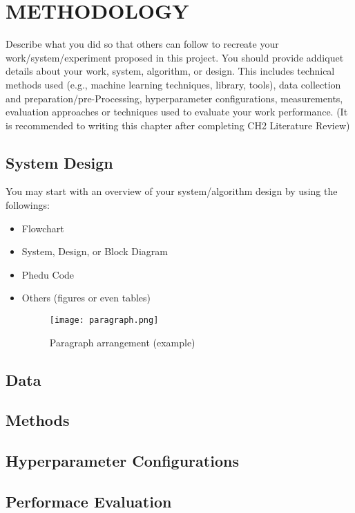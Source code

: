 \chapter{METHODOLOGY}

Describe what you did so that others can follow to recreate your work/system/experiment proposed in this project.
You should provide addiquet details about your work, system, algorithm, or design. This includes technical methods used (e.g., machine learning techniques, library, tools), data collection and preparation/pre-Processing, hyperparameter configurations, measurements, evaluation approaches or techniques used to evaluate your work performance. (It is recommended to writing this chapter after completing CH2 Literature Review)

\section{System Design}
\noindent\hspace{2.2em}You may start with an overview of your system/algorithm design by using the followings:
\begin{itemize}
    \item Flowchart
    \item System, Design, or Block Diagram
    \item Phedu Code
    \item Others (figures or even tables)
    \begin{figure}[!htbp]
    	\centering
    	\texttt{[image: paragraph.png]}
    	\caption{Paragraph arrangement (example)}
    	\label{fig:paragraph}
    \end{figure}
\end{itemize}

\section{Data}

\section{Methods}

\section{Hyperparameter Configurations}

\section{Performace Evaluation}